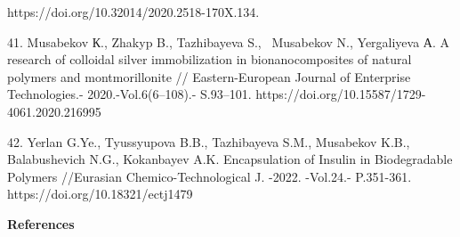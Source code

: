\begin{noparindent}
https://doi.org/10.32014/2020.2518-170X.134.

41. Musabekov К., Zhakyp B., Tazhibayeva S., ~Musabekov N., Yergaliyeva
А. A research of colloidal silver immobilization in bionanocomposites of
natural polymers and montmorillonite // Eastern-European Journal of
Enterprise Technologies.- 2020.-Vol.6(6--108).- S.93--101.
https://doi.org/10.15587/1729-4061.2020.216995

42. Yerlan G.Ye., Tyussyupova B.B., Tazhibayeva S.M., Musabekov K.B.,
Balabushevich N.G., Kokanbayev A.K. Encapsulation of Insulin in
Biodegradable Polymers //Eurasian Chemico-Technological J. -2022.
-Vol.24.- P.351-361. https://doi.org/10.18321/ectj1479
\end{noparindent}

\begin{center}
{\bfseries References}
\end{center}

